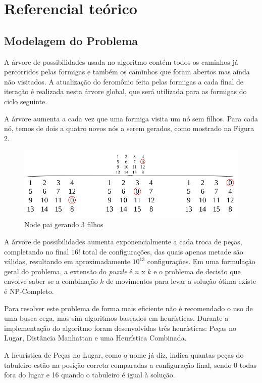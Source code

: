 \documentclass[12pt]{article}
\begin{document}
\section{Referencial teórico}

\subsection{Modelagem do Problema}
A árvore de possibilidades usada no algoritmo contém todos os caminhos já percorridos pelas formigas e também os caminhos que foram abertos mas ainda não visitados. A atualização do feromônio feita pelas formigas a cada final de iteração é realizada nesta árvore global, que será utilizada para as formigas do ciclo seguinte.

A árvore aumenta a cada vez que uma formiga visita um nó sem filhos. Para cada nó, temos de dois a quatro novos nós a serem gerados, como mostrado na Figura 2.

\begin{figure}[!ht]
\centering
\includegraphics[width=.9\textwidth]{geranode.png}
\caption{Node pai gerando 3 filhos}
\label{fig:figura2}
\end{figure}


A árvore de possibilidades aumenta exponencialmente a cada troca de peças, completando no final $16!$ total de configurações, das quais apenas metade são válidas, resultando em aproximadamente $10^{13}$ configurações. Em uma formulação geral do problema, a extensão do \textit{puzzle} é $n$ x $k$ e o problema de decisão que envolve saber se a combinação $k$ de movimentos para levar a solução ótima existe é NP-Completo.

Para resolver este problema de forma mais eficiente não é recomendado o uso de uma busca cega, mas sim algoritmos baseados em heurísticas. Durante a implementação do algoritmo foram desenvolvidas três heurísticas:  Peças no Lugar, Distância Manhattan e uma Heurística Combinada.

A heurística de Peças no Lugar, como o nome já diz, indica quantas peças do tabuleiro estão na posição correta comparadas a configuração final, sendo 0 todas fora do lugar e 16 quando o tabuleiro é igual à solução.
\end{document}
